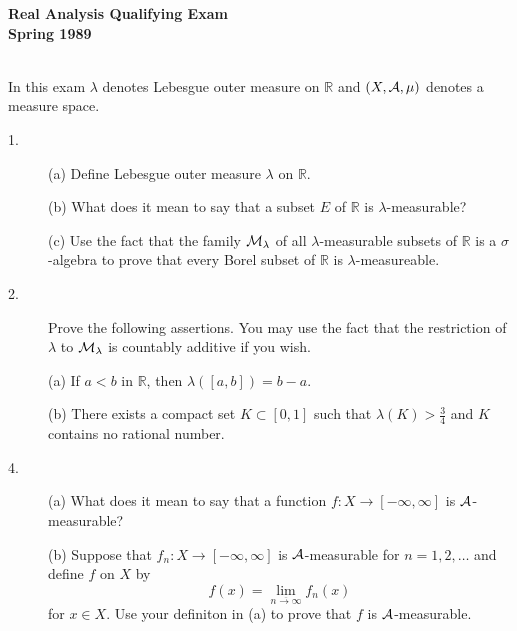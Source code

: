 \documentclass{article}
\def\R{\mathbb R}
\begin{document}






\begin{center}\begin{LARGE}
{\bf Real Analysis Qualifying Exam}\\ 
{\bf Spring 1989}\\ \end{LARGE}
\end{center}
\vspace{0.1in}
\noindent\hrulefill\\

In this exam $\lambda$ denotes Lebesgue outer measure on $\R$ and
$(X, {\cal A}, \mu)$ denotes a measure space.

\begin{description}
\item[1.] (a)
Define Lebesgue outer measure $\lambda$ on $\R$.

\item[\quad] (b)
What does it mean to say that a subset $E$ of $\R$ is $\lambda$-measurable?

\item[\quad] (c)
Use the fact that the family ${\cal M}_\lambda$ of all $\lambda$-measurable
subsets of $\R$ is a $\sigma$-algebra to prove that every Borel subset of
$\R$ is $\lambda$-measureable.

\item[2.]
Prove the following assertions. You may use the fact that the restriction of
$\lambda$ to ${\cal M}_\lambda$ is countably additive if you wish.

\item[\quad] (a)
If $a<b$ in $\R$, then $\lambda([a,b]) = b-a$.

\item[\quad] (b)
There exists a compact set $K \subset [0,1]$ such that
$\lambda (K) > \frac{3}{4}$ and $K$ contains no rational number.

\item[4.] (a)
What does it mean to say that a function $f:X \to [-\infty, \infty]$ is
${\cal A}$-measurable?

\item[\quad] (b)
Suppose that $f_n :X \to [-\infty, \infty]$ is ${\cal A}$-measurable for
$n=1,2, \dots$ and define $f$ on $X$ by
$$f(x) = \lim_{\overline{n \to \infty}} f_n (x)$$
for $x \in X$. Use your definiton in (a) to prove that $f$ is
${\cal A}$-measurable.


\end{description}
\end{document}
